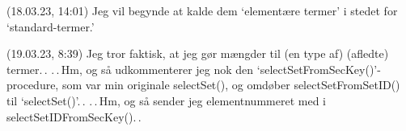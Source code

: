 \documentclass{report}
\begin{document}
(18.03.23, 14:01) Jeg vil begynde at kalde dem `elementære termer' i stedet for `standard-termer.'

(19.03.23, 8:39) Jeg tror faktisk, at jeg gør mængder til (en type af) (afledte) termer.\,. .\,.\,Hm, og så udkommenterer jeg nok den `selectSetFromSecKey()'-procedure, som var min originale selectSet(), og omdøber selectSetFromSetID() til `selectSet()'.\,. .\,.\,Hm, og så sender jeg elementnummeret med i selectSetIDFromSecKey().\,. 


\end{document}
